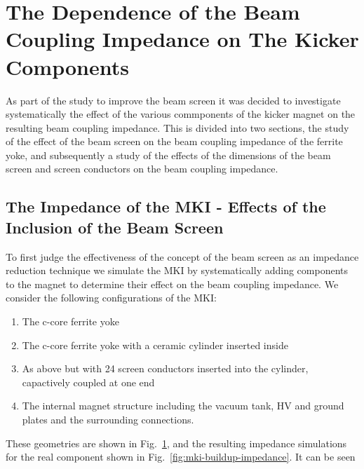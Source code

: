 \section{The Dependence of the Beam Coupling Impedance on The Kicker Components}

As part of the study to improve the beam screen it was decided to investigate systematically the effect of the various commponents of the kicker magnet on the resulting beam coupling impedance. This is divided into two sections, the study of the effect of the beam screen on the beam coupling impedance of the ferrite yoke, and subsequently a study of the effects of the dimensions of the beam screen and screen conductors on the beam coupling impedance.

\subsection{The Impedance of the MKI - Effects of the Inclusion of the Beam Screen}

To first judge the effectiveness of the concept of the beam screen as an impedance reduction technique we simulate the MKI by systematically adding components to the magnet to determine their effect on the beam coupling impedance. We consider the following configurations of the MKI:

\begin{enumerate}
\item{The c-core ferrite yoke}
\item{The c-core ferrite yoke with a ceramic cylinder inserted inside}
\item{As above but with 24 screen conductors inserted into the cylinder, capactively coupled at one end}
\item{The internal magnet structure including the vacuum tank, HV and ground plates and the surrounding connections.}
\end{enumerate}

These geometries are shown in Fig.~\ref{fig:mki-layout-buildup}, and the resulting impedance simulations for the real component shown in Fig.~\ref{fig:mki-buildup-impedance}. It can be seen
 
\begin{figure}
\label{fig:mki-layout-buildup}
\end{figure}

